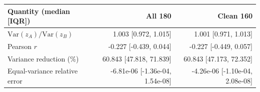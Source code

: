 \begin{tabular}{lrr}
\toprule
Quantity (median [IQR]) & All 180 & Clean 160 \\
\midrule
$\mathrm{Var}(z_A)/\mathrm{Var}(z_B)$ & 1.003 [0.972, 1.015] & 1.001 [0.971, 1.013] \\
Pearson $r$ & -0.227 [-0.439, 0.044] & -0.227 [-0.449, 0.057] \\
Variance reduction (\%) & 60.843 [47.818, 71.839] & 60.843 [47.173, 72.352] \\
Equal-variance relative error & -6.81e-06 [-1.36e-04, 1.54e-08] & -4.26e-06 [-1.10e-04, 2.08e-08] \\
\bottomrule
\end{tabular}